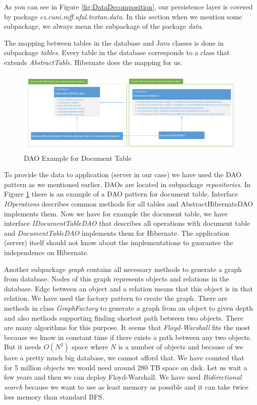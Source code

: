 As you can see in Figure \ref{fig:DataDecomposition}, our persistence layer is
covered by package \emph{cz.cuni.mff.ufal.textan.data}. In this section when we
mention some subpackage, we always mean the subpackage of the package \emph{data}.

The mapping between tables in the database and Java classes is done in
subpackage \emph{tables}. Every table in the database corresponds to a class
that extends \emph{AbstractTable}. Hibernate does the mapping for us.

\begin{figure}[!htb]
        \centering
        \includegraphics[width=\textwidth]{Images/DatabaseDAO}
        \caption{DAO Example for Document Table}
        \label{fig:DatabaseDAO}
\end{figure}

To provide the data to application (server in our case) we have used the DAO
pattern as we mentioned earlier. DAOs are located in subpackage
\emph{repositories}. In Figure \ref{fig:DatabaseDAO} there is an example of a
DAO pattern for document table. Interface \emph{IOperations} describes common
methods for all tables and AbstractHibernateDAO implements them. Now we have for
example the document table, we have interface \emph{IDocumentTableDAO} that
describes all operations with document table and \emph{DocumentTableDAO}
implements them for Hibernate. The application (server) itself should not know about the implementations to guarantee the independence on Hibernate.

Another subpackage \emph{graph} contains all necessary methods to generate a
graph from database. Nodes of this graph represents objects and relations in
the database. Edge between an object and a relation means that this object is in
that relation. We have used the factory pattern to create the graph. There are
methods in class \emph{GraphFactory} to generate a graph from an object to given
depth and also methods supporting finding shortest path between two objects.
There are many algorithms for this purpose. It seems that \emph{Floyd-Warshall}
fits the most because we know in constant time if there exists a path between
any two objects. But it needs $O(N^2)$ space where $N$ is a number of objects
and because of we have a pretty much big database, we cannot afford that. We
have counted that for 5 million objects we would need around 280 TB space on
disk. Let us wait a few years and then we can deploy Floyd-Warshall. We have
used \emph{Bidirectional search} because we want to use as least memory as
possible and it can take twice less memory than standard BFS.

